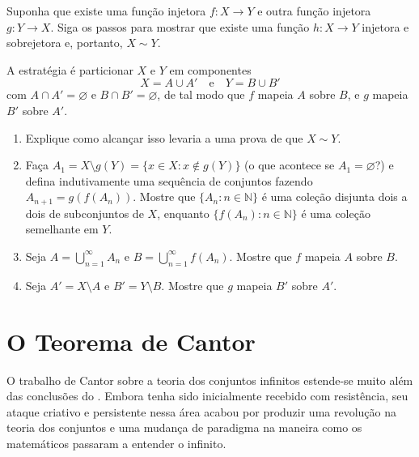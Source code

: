 \begin{exercise}\label{ex:schroder-bernstein}
Suponha que existe uma função injetora $f \colon X \to Y$ e outra função injetora $g \colon Y \to X$. Siga os passos para mostrar que existe uma função $h \colon X \to Y$ injetora e sobrejetora e, portanto, $X \sim Y$.

A estratégia é particionar $X$ e $Y$ em componentes
\[
X = A \cup A' \quad \text{e} \quad Y = B \cup B'
\]
com $A \cap A' = \varnothing$ e $B \cap B' = \varnothing$, de tal modo que $f$ mapeia $A$ sobre $B$, e $g$ mapeia $B'$ sobre $A'$.
\begin{enumerate}[label=\alph*)]
\item Explique como alcançar isso levaria a uma prova de que $X \sim Y$.
\item Faça $A_{1} = X \setminus g(Y) = \{x \in X : x \notin g(Y)\}$ (o que acontece se $A_{1} = \varnothing$?) e defina indutivamente uma sequência de conjuntos fazendo $A_{n+1} = g(f(A_{n}))$. Mostre que $\{A_{n} : n \in \mathbb{N}\}$ é uma coleção disjunta dois a dois de subconjuntos de $X$, enquanto $\{f(A_{n}) : n \in \mathbb{N}\}$ é uma coleção semelhante em $Y$.
\item Seja $A = \bigcup_{n=1}^{\infty} A_{n}$ e $B = \bigcup_{n=1}^{\infty} f(A_{n})$. Mostre que $f$ mapeia $A$ sobre $B$.
\item Seja $A' = X \setminus A$ e $B' = Y \setminus B$. Mostre que $g$ mapeia $B'$ sobre $A'$.
\end{enumerate}
\end{exercise}



\section{O Teorema de Cantor}\label{sec:teorema-cantor}

O trabalho de Cantor sobre a teoria dos conjuntos infinitos estende-se muito além das conclusões do . Embora tenha sido inicialmente recebido com resistência, seu ataque criativo e persistente nessa área acabou por produzir uma revolução na teoria dos conjuntos e uma mudança de paradigma na maneira como os matemáticos passaram a entender o infinito.

